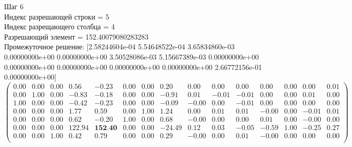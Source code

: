 \documentclass{article}
\begin{document}
\begin{flushleft}
    Шаг 6\\
    Индекс разрешающей строки = 5\\
    Индекс разрещающего столбца = 4\\
    Разрешающий элемент = 152.40079080283283\\
    Промежуточное решение:
    [2.58244604e-04 5.54648522e-04 3.65834860e-03 0.00000000e+00
    0.00000000e+00 3.50528086e-03 5.15667389e-03 0.00000000e+00
    0.00000000e+00 0.00000000e+00 0.00000000e+00 0.00000000e+00
    2.66772156e-01 0.00000000e+00]
\begin{equation*}
\begin{pmatrix}
 0.00 & 0.00 & 0.00 &   0.56 &  -0.23 & 0.00 & 0.00 &   0.20 &  0.00 &  0.00 &  0.00 &  0.00 & 0.00 &  0.00 & 0.01 \\
 0.00 & 1.00 & 0.00 &  -0.83 &  -0.18 & 0.00 & 0.00 &  -0.91 &  0.01 & -0.01 & -0.01 &  0.00 & 0.00 &  0.01 & 0.00 \\
 1.00 & 0.00 & 0.00 &  -0.42 &  -0.23 & 0.00 & 0.00 &  -0.09 & -0.00 &  0.00 & -0.01 &  0.00 & 0.00 &  0.00 & 0.00 \\
 0.00 & 0.00 & 0.00 &   1.77 &   0.59 & 0.00 & 1.00 &   1.24 &  0.00 &  0.01 &  0.01 & -0.00 & 0.00 & -0.01 & 0.01 \\
 0.00 & 0.00 & 0.00 &   0.62 &  -0.20 & 1.00 & 0.00 &   0.68 & -0.00 &  0.00 &  0.00 &  0.01 & 0.00 & -0.00 & 0.00 \\
 0.00 & 0.00 & 0.00 & 122.94 & \textbf{152.40} & 0.00 & 0.00 & -24.49 &  0.12 &  0.03 & -0.05 & -0.59 & 1.00 & -0.25 & 0.27 \\
 0.00 & 0.00 & 1.00 &   0.42 &   0.79 & 0.00 & 0.00 &   0.29 & -0.00 &  0.00 &  0.01 & -0.00 & 0.00 &  0.00 & 0.00 \\
\end{pmatrix}
\end{equation*}
\end{flushleft}
\end{document}
